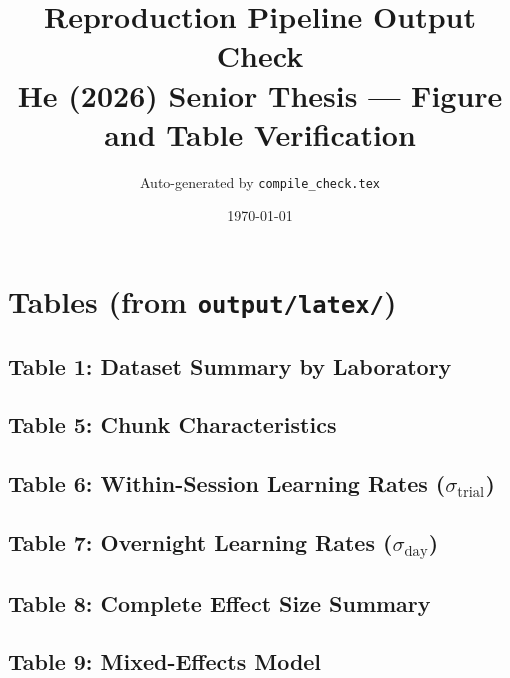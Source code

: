 \documentclass[11pt]{article}
\title{Reproduction Pipeline Output Check\\
\large He (2026) Senior Thesis — Figure and Table Verification}
\author{Auto-generated by \texttt{compile\_check.tex}}
\date{\today}
\begin{document}
\maketitle
\tableofcontents
\clearpage

\section{Tables (from \texttt{output/latex/})}

\subsection{Table 1: Dataset Summary by Laboratory}
\setcounter{table}{0}  %


\clearpage
\subsection{Table 5: Chunk Characteristics}
\setcounter{table}{4}  %


\clearpage
\subsection{Table 6: Within-Session Learning Rates ($\sigma_{\text{trial}}$)}
\setcounter{table}{5}


\clearpage
\subsection{Table 7: Overnight Learning Rates ($\sigma_{\text{day}}$)}
\setcounter{table}{6}


\clearpage
\subsection{Table 8: Complete Effect Size Summary}
\setcounter{table}{7}


\clearpage
\subsection{Table 9: Mixed-Effects Model}
\setcounter{table}{8}

\end{document}

